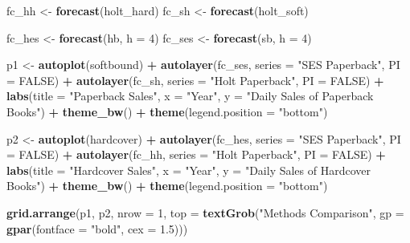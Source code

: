 \documentclass[openany]{book}
\newenvironment{Shaded}{\begin{snugshade}}{\end{snugshade}}
\newcommand{\DataTypeTok}[1]{\textcolor[rgb]{0.13,0.29,0.53}{#1}}
\newcommand{\DecValTok}[1]{\textcolor[rgb]{0.00,0.00,0.81}{#1}}
\newcommand{\FloatTok}[1]{\textcolor[rgb]{0.00,0.00,0.81}{#1}}
\newcommand{\KeywordTok}[1]{\textcolor[rgb]{0.13,0.29,0.53}{\textbf{#1}}}
\newcommand{\NormalTok}[1]{#1}
\newcommand{\OperatorTok}[1]{\textcolor[rgb]{0.81,0.36,0.00}{\textbf{#1}}}
\newcommand{\OtherTok}[1]{\textcolor[rgb]{0.56,0.35,0.01}{#1}}
\newcommand{\StringTok}[1]{\textcolor[rgb]{0.31,0.60,0.02}{#1}}
\begin{document}
\begin{Shaded}
\begin{Highlighting}[]
\NormalTok{fc_hh <-}\StringTok{ }\KeywordTok{forecast}\NormalTok{(holt_hard)}
\NormalTok{fc_sh <-}\StringTok{ }\KeywordTok{forecast}\NormalTok{(holt_soft)}

\NormalTok{fc_hes <-}\StringTok{ }\KeywordTok{forecast}\NormalTok{(hb, }\DataTypeTok{h =} \DecValTok{4}\NormalTok{)}
\NormalTok{fc_ses <-}\StringTok{ }\KeywordTok{forecast}\NormalTok{(sb, }\DataTypeTok{h =} \DecValTok{4}\NormalTok{)}

\NormalTok{p1 <-}\StringTok{ }\KeywordTok{autoplot}\NormalTok{(softbound) }\OperatorTok{+}\StringTok{ }\KeywordTok{autolayer}\NormalTok{(fc_ses, }\DataTypeTok{series =} \StringTok{"SES Paperback"}\NormalTok{, }
  \DataTypeTok{PI =} \OtherTok{FALSE}\NormalTok{) }\OperatorTok{+}\StringTok{ }\KeywordTok{autolayer}\NormalTok{(fc_sh, }\DataTypeTok{series =} \StringTok{"Holt Paperback"}\NormalTok{, }
  \DataTypeTok{PI =} \OtherTok{FALSE}\NormalTok{) }\OperatorTok{+}\StringTok{ }\KeywordTok{labs}\NormalTok{(}\DataTypeTok{title =} \StringTok{"Paperback Sales"}\NormalTok{, }\DataTypeTok{x =} \StringTok{"Year"}\NormalTok{, }
  \DataTypeTok{y =} \StringTok{"Daily Sales of Paperback Books"}\NormalTok{) }\OperatorTok{+}\StringTok{ }\KeywordTok{theme_bw}\NormalTok{() }\OperatorTok{+}\StringTok{ }
\StringTok{  }\KeywordTok{theme}\NormalTok{(}\DataTypeTok{legend.position =} \StringTok{"bottom"}\NormalTok{)}


\NormalTok{p2 <-}\StringTok{ }\KeywordTok{autoplot}\NormalTok{(hardcover) }\OperatorTok{+}\StringTok{ }\KeywordTok{autolayer}\NormalTok{(fc_hes, }\DataTypeTok{series =} \StringTok{"SES Paperback"}\NormalTok{, }
  \DataTypeTok{PI =} \OtherTok{FALSE}\NormalTok{) }\OperatorTok{+}\StringTok{ }\KeywordTok{autolayer}\NormalTok{(fc_hh, }\DataTypeTok{series =} \StringTok{"Holt Paperback"}\NormalTok{, }
  \DataTypeTok{PI =} \OtherTok{FALSE}\NormalTok{) }\OperatorTok{+}\StringTok{ }\KeywordTok{labs}\NormalTok{(}\DataTypeTok{title =} \StringTok{"Hardcover Sales"}\NormalTok{, }\DataTypeTok{x =} \StringTok{"Year"}\NormalTok{, }
  \DataTypeTok{y =} \StringTok{"Daily Sales of Hardcover Books"}\NormalTok{) }\OperatorTok{+}\StringTok{ }\KeywordTok{theme_bw}\NormalTok{() }\OperatorTok{+}\StringTok{ }
\StringTok{  }\KeywordTok{theme}\NormalTok{(}\DataTypeTok{legend.position =} \StringTok{"bottom"}\NormalTok{)}

\KeywordTok{grid.arrange}\NormalTok{(p1, p2, }\DataTypeTok{nrow =} \DecValTok{1}\NormalTok{, }\DataTypeTok{top =} \KeywordTok{textGrob}\NormalTok{(}\StringTok{"Methods Comparison"}\NormalTok{, }
  \DataTypeTok{gp =} \KeywordTok{gpar}\NormalTok{(}\DataTypeTok{fontface =} \StringTok{"bold"}\NormalTok{, }\DataTypeTok{cex =} \FloatTok{1.5}\NormalTok{)))}
\end{Highlighting}
\end{Shaded}
\end{document}
